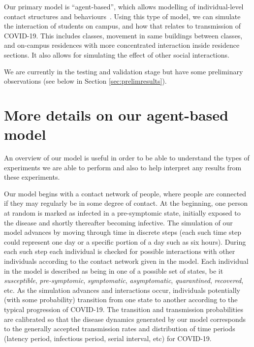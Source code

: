 \documentclass[fleqn,10pt]{SelfArx} %
\newcommand{\ed}[1]{{\color{blue} #1}}
\begin{document}
Our primary model is ``agent-based'', which allows modelling of individual-level contact structures and behaviours~\cite{luke_systems_2012,el-sayed_social_2012}.  Using this type of model, we can simulate the interaction of students on campus, and how that relates to transmission of COVID-19.
This includes classes, movement in same buildings between classes, and on-campus residences with more concentrated interaction inside residence sections.  It also allows for simulating the effect of other social interactions.


We are currently in the testing and validation stage but have some preliminary observations (see below in Section \ref{sec:prelimresults}).



\section{More details on our agent-based model}
An overview of our model is useful in order to be able to understand the types of experiments we are able to perform and also to help interpret any results from these experiments.

Our model begins with a contact network of people, where people are connected if they may regularly be in some degree of contact.  At the beginning, one person at random is marked as infected in a pre-symptomic state, initially exposed to the disease and shortly thereafter becoming infective.  
The simulation of our model advances by moving through time in discrete steps (each such time step could represent one day or a specific portion of a day such as six hours).
During each such step each individual is checked for possible interactions with other individuals according to the contact network given in the model.
Each individual in the model is described as being in one of a possible set of states, be it \emph{susceptible}, \emph{pre-symptomic}, \emph{symptomatic}, \emph{asymptomatic}, \emph{quarantined}, \emph{recovered}, etc.  As the simulation advances and interactions occur, individuals potentially (with some probability) transition from one state to another according to the typical progression of COVID-19.
The transition and transmission probabilities are calibrated so that the disease dynamics generated by our model corresponds to the generally accepted transmission rates and distribution of time periods (latency period, infectious period, serial interval, etc) for COVID-19.
\end{document}
